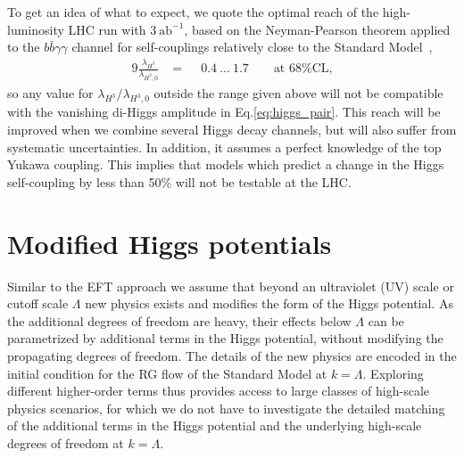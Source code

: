 \documentclass[aps,prd,11pt,tightenlines,superscriptaddress,nofootinbib,preprintnumbers,notitlepage]{revtex4-1}
\newcommand{\iab}{\text{ab}^{-1}}
\begin{document}
To get an idea of what to expect, we quote the optimal reach of the
high-luminosity LHC run with $3~\iab$, based on the Neyman-Pearson
theorem applied to the $b\bar{b} \gamma \gamma$ channel for
self-couplings relatively close to the Standard Model~\cite{madmax},
%
\begin{alignat}{9}
\frac{\lambda_{H^3}}{\lambda_{H^3,0}} &= \phantom{-} 0.4~...~1.7 \qquad \text{at 68\% CL,}
\label{eq:lhc}
\end{alignat}
%
so any value for $\lambda_{H^3}/\lambda_{H^3,0}$ outside the range given  above will not be 
compatible with the vanishing di-Higgs amplitude in Eq.\eqref{eq:higgs_pair}.
This reach will be improved when we combine several Higgs decay
channels, but will also suffer from systematic uncertainties. In
addition, it assumes a perfect knowledge of the top Yukawa
coupling. This implies that models which predict a change in the
Higgs self-coupling by less than 50\% will not be testable at the LHC.

\section{Modified Higgs potentials}
\label{sec:model}

Similar to the EFT approach we assume that beyond an ultraviolet (UV)
scale or cutoff scale $\Lambda$ new physics exists and modifies the
form of the Higgs potential.  As the additional degrees of freedom are
heavy, their effects below $\Lambda$ can be parametrized by additional
terms in the Higgs potential, without modifying the propagating
degrees of freedom.  The details of the new physics are encoded in the
initial condition for the RG flow of the Standard Model at
$k =\Lambda$.  Exploring different higher-order terms thus provides
access to large classes of high-scale physics scenarios, for which we
do not have to investigate the detailed matching of the additional
terms in the Higgs potential and the underlying high-scale degrees of
freedom at $k = \Lambda$.
\end{document}
